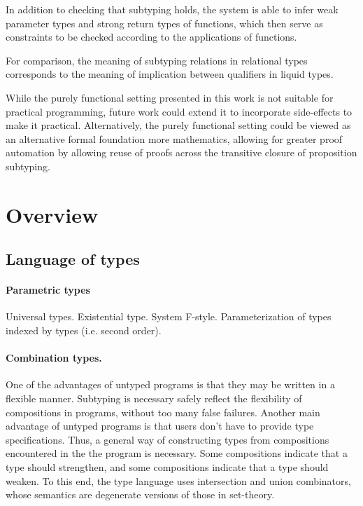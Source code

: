 \documentclass[acmsmall]{acmart}
\theoremstyle{definition}
\begin{document}
In addition to checking that subtyping holds, the system is able to infer weak 
parameter types and strong return types of functions, which then serve as constraints
to be checked according to the applications of functions.

For comparison, the meaning of subtyping relations in relational types corresponds 
to the meaning of implication between qualifiers in liquid types.

While the purely functional setting presented in this work is not suitable for practical programming,
future work could extend it to incorporate side-effects to make it practical.
Alternatively, the purely functional setting could be viewed as an alternative formal foundation more
mathematics, allowing for greater proof automation by allowing reuse of proofs across the transitive closure of 
proposition subtyping.



\section{Overview}

\subsection{Language of types}

\paragraph{Parametric types}
Universal types. Existential type. System F-style. Parameterization of types indexed by types (i.e. second order).


\paragraph{Combination types.}
One of the advantages of untyped programs is that they may be written in a flexible manner.
Subtyping is necessary safely reflect the flexibility of compositions in programs, without too many false failures.
Another main advantage of untyped programs is that users don't have to provide type specifications.
Thus, a general way of constructing types from compositions encountered in the the program is necessary.
Some compositions indicate that a type should strengthen, and some compositions indicate that a type should weaken.
To this end, the type language uses intersection and union combinators, 
whose semantics are degenerate versions of those in set-theory.
\end{document}
